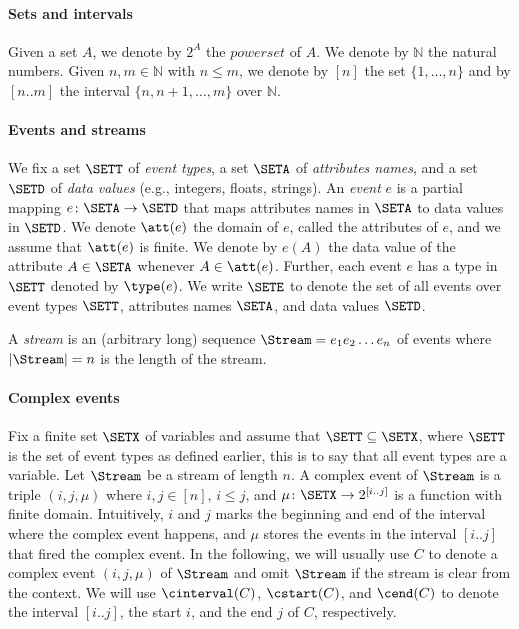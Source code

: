
\paragraph{Sets and intervals} Given a set $A$, we denote by $2^{A}$ the $\textit{powerset}$ of $A$. We denote by $\mathbb{N}$ the natural numbers. Given $n,m \in \mathbb{N}$ with $n \leq m$, we denote by $[n]$ the set $\{1,\dots,n\}$ and by $[n..m]$ the interval $\{n,n+1,\dots,m\}$ over $\mathbb{N}$. %

\paragraph{Events and streams} We fix a set $\SETT$ of \textit{event types}, a set $\SETA$ of \textit{attributes names}, and a set $\SETD$ of \textit{data values} (e.g., integers, floats, strings). An \textit{event} $e$ is a partial mapping $e \colon \SETA \to \SETD$ that maps attributes names in $\SETA$ to data values in $\SETD$. We denote $\att(e)$ the domain of $e$, called the attributes of $e$, and we assume that $\att(e)$ is finite. We denote by $e(A)$ the data value of the attribute $A \in \SETA$ whenever $A \in \att(e)$. Further, each event $e$ has a type in $\SETT$ denoted by $\type(e)$. We write $\SETE$ to denote the set of all events over event types $\SETT$, attributes names $\SETA$, and data values $\SETD$.

A \textit{stream} is an (arbitrary long) sequence $\Stream = e_1 e_2 \dots e_n$ of events where $|\Stream| = n$ is the length of the stream.

\paragraph{Complex events} Fix a finite set $\SETX$ of variables and assume that $\SETT \subseteq \SETX$, where $\SETT$ is the set of event types as defined earlier, this is to say that all event types are a variable. Let $\Stream$ be a stream of length $n$. A complex event of $\Stream$ is a triple $(i, j, \mu)$ where $i, j \in [n]$, $i \leq j$, and $\mu \colon \SETX \to 2^{[i..j]}$ is a function with finite domain. Intuitively, $i$ and $j$ marks the beginning and end of the interval where the complex event happens, and $\mu$ stores the events in the interval $[i..j]$ that fired the complex event. In the following, we will usually use $C$ to denote a complex event $(i, j, \mu)$ of $\Stream$ and omit $\Stream$ if the stream is clear from the context. We will use $\cinterval(C)$, $\cstart(C)$, and $\cend(C)$ to denote the interval $[i..j]$, the start $i$, and the end $j$ of $C$, respectively.

